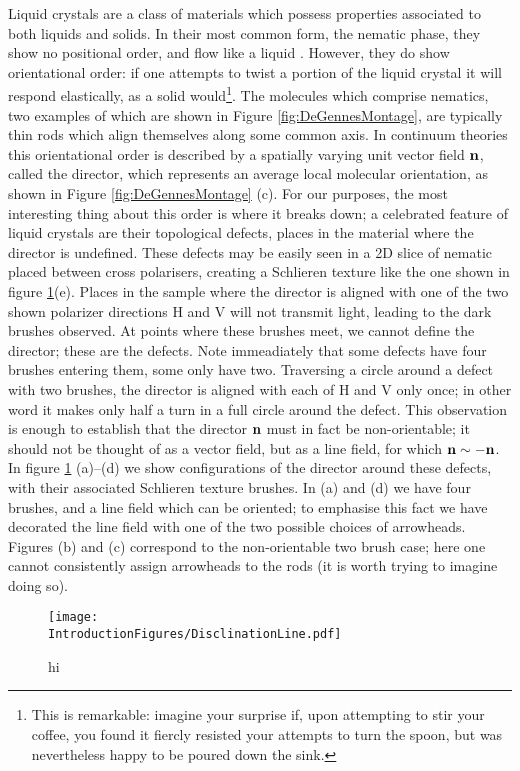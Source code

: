 Liquid crystals are a class of materials which possess properties associated to both liquids and solids. In their most common form, the nematic phase, they show no positional order, and flow like a liquid \cite{DeGennes}. However, they do show orientational order: if one attempts to twist a portion of the liquid crystal it will respond elastically, as a solid would\footnote{This is remarkable: imagine your surprise if, upon attempting to stir your coffee, you found it fiercly resisted your attempts to turn the spoon, but was nevertheless happy to be poured down the sink.}. The molecules which comprise nematics, two examples of which are shown in Figure \ref{fig:DeGennesMontage}, are typically thin rods which align themselves along some common axis. In continuum theories this orientational order is described by a spatially varying unit vector field $\bf n$, called the director, which represents an average local molecular orientation, as shown in Figure \ref{fig:DeGennesMontage} (c). For our purposes, the most interesting thing about this order is where it breaks down; a celebrated feature of liquid crystals are their topological defects, places in the material where the director is undefined. These defects may be easily seen in a 2D slice of nematic placed between cross polarisers, creating a Schlieren texture \cite{DeGennes} like the one shown in figure \ref{fig:Disclination}(e). Places in the sample where the director is aligned with one of the two shown polarizer directions H and V will not transmit light, leading to the dark brushes observed. At points where these brushes meet, we cannot define the director; these are the defects. Note immeadiately that some defects have four brushes entering them, some only have two. Traversing a circle around a defect with two brushes, the director is aligned with each of H and V only once; in other word it makes only half a turn in a full circle around the defect. This observation is enough to establish that the director $\bf{n}$ must in fact be non-orientable; it should not be thought of as a vector field, but as a line field, for which $\bf n \sim - \bf n$. In figure \ref{fig:Disclination} (a)--(d) we show configurations of the director around these defects, with their associated Schlieren texture brushes. In (a) and (d) we have four brushes, and a line field which can be oriented; to emphasise this fact we have decorated the line field with one of the two possible choices of arrowheads. Figures (b) and (c) correspond to the non-orientable two brush case; here one cannot consistently assign arrowheads to the rods (it is worth trying to imagine doing so). 
\begin{figure}[htbp]
\centering
\texttt{[image: \\IntroductionFigures/DisclinationLine.pdf]}
\caption{hi }
\label{fig:Disclination}
\end{figure}

